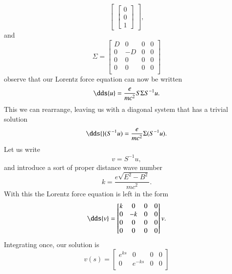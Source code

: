 {\begin{equation}
\begin{bmatrix}
\begin{bmatrix}
0 \\
0 \\
1
\end{bmatrix}
\end{bmatrix},
\end{equation}
%
and
%
\begin{equation}\label{eqn:relElectroDynProblemSet2:730}
\Sigma =
\begin{bmatrix}
D & 0 & 0 & 0 \\
0 & -D & 0 & 0 \\
0 & 0 & 0 & 0 \\
0 & 0 & 0 & 0 \\
\end{bmatrix}
\end{equation}
%
observe that our Lorentz force equation can now be written
%
\begin{equation}\label{eqn:relElectroDynProblemSet2:750}
\dds{u} = \frac{e}{m c^2} S \Sigma S^{-1} u.
\end{equation}
%
This we can rearrange, leaving us with a diagonal system that has a trivial solution
%
\begin{equation}\label{eqn:relElectroDynProblemSet2:770}
\dds{} (S^{-1} u) = \frac{e}{m c^2} \Sigma (S^{-1} u).
\end{equation}
%
Let us write
%
\begin{equation}\label{eqn:relElectroDynProblemSet2:790}
v = S^{-1} u,
\end{equation}
%
and introduce a sort of proper distance wave number
%
\begin{equation}\label{eqn:relElectroDynProblemSet2:810}
k = \frac{e \sqrt{E^2 - B^2}}{m c^2}.
\end{equation}
%
With this the Lorentz force equation is left in the form
%
\begin{equation}\label{eqn:relElectroDynProblemSet2:830}
\dds{v} =
\begin{bmatrix}
k & 0 & 0 & 0 \\
0 & -k & 0 & 0 \\
0 & 0 & 0 & 0 \\
0 & 0 & 0 & 0 \\
\end{bmatrix} v.
\end{equation}
%
Integrating once, our solution is
%
\begin{equation}\label{eqn:relElectroDynProblemSet2:850}
v(s) =
\begin{bmatrix}
e^{ks} & 0 & 0 & 0 \\
0 & e^{-ks} & 0 & 0 \\

\end{bmatrix}
\end{equation}}
